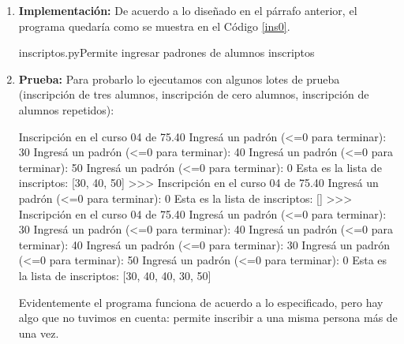 \begin{enumerate}
\begin{itemize}
Modificamos el esquema anterior para ajustarnos a nuestra situación:

\begin{itemize}
\item La lista de inscriptos es vacía.
\item Pedir padrón.
\item Mientras el padrón sea positivo:
\begin{itemize}
\item Agregar el padrón a la lista.
\item Pedir padrón.
\end{itemize}
\end{itemize}

\end{itemize}

\item {\bf Implementación:}
De acuerdo a lo diseñado en el párrafo anterior, el programa quedaría como
se muestra en el Código \ref{ins0}.

\begin{codigo}{inscriptos.py}{Permite ingresar padrones de alumnos
inscriptos}
\label{ins0}

\end{codigo}

\item {\bf Prueba:}
Para probarlo lo ejecutamos con algunos lotes de prueba (inscripción de
tres alumnos, inscripción de cero alumnos, inscripción de alumnos
repetidos):

\begin{codigo-python-sn}
Inscripción en el curso 04 de 75.40
Ingresá un padrón (<=0 para terminar): 30
Ingresá un padrón (<=0 para terminar): 40
Ingresá un padrón (<=0 para terminar): 50
Ingresá un padrón (<=0 para terminar): 0
Esta es la lista de inscriptos:  [30, 40, 50]
>>>
Inscripción en el curso 04 de 75.40
Ingresá un padrón (<=0 para terminar): 0
Esta es la lista de inscriptos:  []
>>>
Inscripción en el curso 04 de 75.40
Ingresá un padrón (<=0 para terminar): 30
Ingresá un padrón (<=0 para terminar): 40
Ingresá un padrón (<=0 para terminar): 40
Ingresá un padrón (<=0 para terminar): 30
Ingresá un padrón (<=0 para terminar): 50
Ingresá un padrón (<=0 para terminar): 0
Esta es la lista de inscriptos:  [30, 40, 40, 30, 50]
\end{codigo-python-sn}

Evidentemente el programa funciona de acuerdo a lo especificado, pero
hay algo que no tuvimos en cuenta: permite inscribir a una misma persona
más de una vez.


\end{enumerate}
